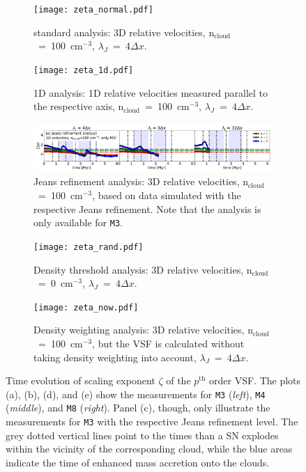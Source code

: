 \begin{figure}[!htb]
\centering
\begin{subfigure}{\textwidth}
    \texttt{[image: zeta\_normal.pdf]}
    \caption{standard analysis: 3D relative velocities, n$_\mathrm{cloud}$~=~100~cm$^{-3}$, $\lambda_J$~=~$4\Delta{}x$.}
    \label{pic:results:zeta_all_normal}
\end{subfigure}

\begin{subfigure}{\textwidth}
    \texttt{[image: zeta\_1d.pdf]}
    \caption{1D analysis: 1D relative velocities measured parallel to the respective axis, n$_\mathrm{cloud}$~=~100~cm$^{-3}$, $\lambda_J$~=~$4\Delta{}x$.}
    \label{pic:results:zeta_all_1d}
\end{subfigure}

\begin{subfigure}{\textwidth}
    \includegraphics[width=\textwidth]{zeta_jeans.pdf}
    \caption{Jeans refinement analysis: 3D relative velocities, n$_\mathrm{cloud}$~=~100~cm$^{-3}$, based on data simulated with the respective Jeans refinement. Note that the analysis is only available for \texttt{M3}.}
    \label{pic:results:zeta_all_jeans}
\end{subfigure}

\begin{subfigure}{\textwidth}
    \texttt{[image: zeta\_rand.pdf]}
    \caption{Density threshold analysis: 3D relative velocities, n$_\mathrm{cloud}$~=~0~cm$^{-3}$, $\lambda_J$~=~$4\Delta{}x$.}
    \label{pic:results:zeta_all_rand}
\end{subfigure}

\begin{subfigure}{\textwidth}
    \texttt{[image: zeta\_now.pdf]}
    \caption{Density weighting analysis: 3D relative velocities, n$_\mathrm{cloud}$~=~100~cm$^{-3}$, but the VSF is calculated without taking density weighting into account, $\lambda_J$~=~$4\Delta{}x$.}
    \label{pic:results:zeta_all_now}
\end{subfigure}

\caption{
	Time evolution of scaling exponent $\zeta$ of the $p^\mathrm{th}$ order VSF. 
	The plots (a), (b), (d), and (e) show the measurements for \texttt{M3} (\textit{left}), \texttt{M4} (\textit{middle}), and \texttt{M8} (\textit{right}).
    Panel (c), though, only illustrate the measurements for \texttt{M3} with the respective Jeans refinement level. 
    The grey dotted vertical lines point to the times than a SN explodes within the vicinity of the corresponding cloud, while the blue areas indicate the time of enhanced mass accretion onto the clouds. 
}
\label{pic:results:zeta_all}
\end{figure}

